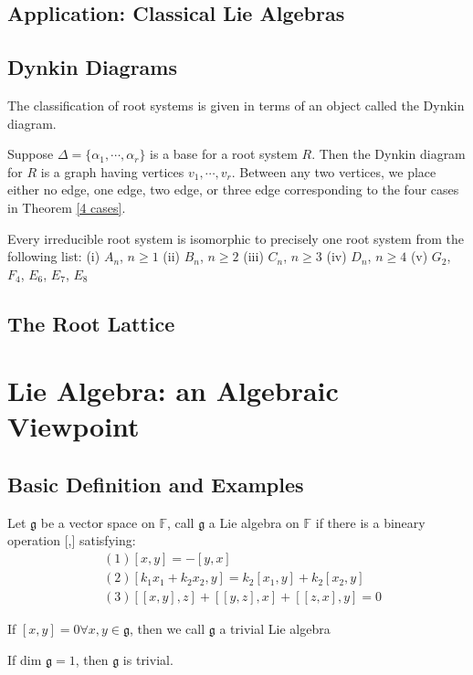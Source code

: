 \subsection{Application: Classical Lie Algebras}



\subsection{Dynkin Diagrams}
The classification of root systems is given in terms of an object called the Dynkin diagram.

Suppose $\Delta=\{\alpha_1,\cdots,\alpha_r\}$ is a base for a root system $R$.
Then the Dynkin diagram for $R$ is a graph having vertices $v_1,\cdots,v_r$.
Between any two vertices, we place either no edge, one edge, two edge, or three edge corresponding to the four cases in Theorem \ref{4 cases}.


\begin{theorem}
    Every irreducible root system is isomorphic to precisely one root system from the following list:\newline 
    (i) $A_n$, $n\geq 1$ \newline 
    (ii) $B_n$, $n\geq 2$\newline 
    (iii) $C_n$, $n\geq 3$\newline 
    (iv) $D_n$, $n\geq 4$\newline 
    (v) $G_2$, $F_4$, $E_6$, $E_7$, $E_8$
\end{theorem}

\subsection{The Root Lattice}



\section{Lie Algebra: an Algebraic Viewpoint}
\subsection{Basic Definition and Examples}
\begin{definition}
Let $\mathfrak{g}$ be a vector space on $\mathbb{F}$, call $\mathfrak{g}$ a Lie algebra on $\mathbb{F}$ if there is a bineary operation [,] satisfying:
\begin{align*}
&(1)[x,y]=-[y,x]\\
&(2)[k_1x_1+k_2x_2,y]=k_2[x_1,y]+k_2[x_2,y]\\
&(3)[[x,y],z]+[[y,z],x]+[[z,x],y]=0
\end{align*}
\end{definition}
\begin{remark}
If $[x,y]=0\forall x,y\in\mathfrak{g}$, then we call $\mathfrak{g}$ a trivial Lie algebra
\end{remark}
\begin{example}
If dim $\mathfrak{g}=1$, then $\mathfrak{g}$ is trivial.
\end{example}
